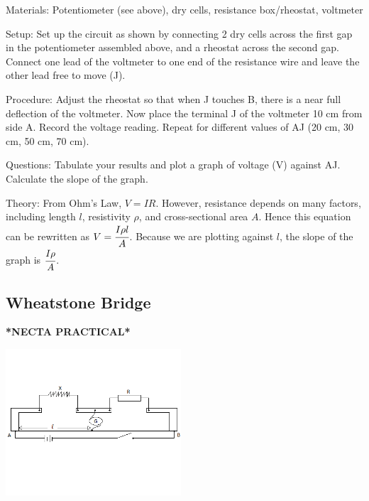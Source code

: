 \begin{multicols}{2}
\begin{description*}
\item[Materials:]{Potentiometer (see above), dry cells, resistance box/rheostat, voltmeter}
\item[Setup:]{Set up the circuit as shown by connecting 2 dry cells across the first gap in the potentiometer assembled above, and a rheostat across the second gap. Connect one lead of the voltmeter to one end of the resistance wire and leave the other lead free to move (J).}
\item[Procedure:]{Adjust the rheostat so that when J touches B, there is a near full deflection of the voltmeter. Now place the terminal J of the voltmeter 10 cm from side A. Record the voltage reading. Repeat for different values of AJ (20 cm, 30 cm, 50 cm, 70 cm).}
\item[Questions:]{Tabulate your results and plot a graph of voltage (V) against AJ. Calculate the slope of the graph.}
\item[Theory:]{From Ohm's Law, $V = IR$. However, resistance depends on many factors, including length $l$, resistivity $\rho$, and cross-sectional area $A$. Hence this equation can be rewritten as $V = \cfrac{I \rho l}{A}$. Because we are plotting against $l$, the slope of the graph is $\cfrac{I \rho}{A}$.}
\end{description*}

\subsection{Wheatstone Bridge} 
\textbf{*NECTA PRACTICAL*}

\begin{center}
\includegraphics[width=0.49\textwidth]{./img/metre-bridge-assembly.png}
\end{center}


\end{multicols}
